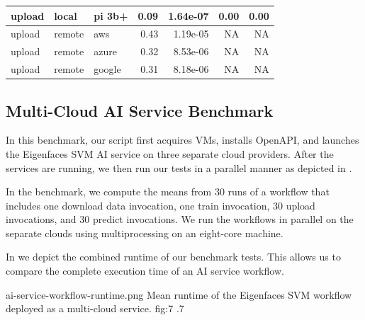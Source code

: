 \begin{table}[htb]
{\begin{tabular}{lllrrrr}
            upload &   local &    pi 3b+ &    0.09 & 1.64e-07 &                0.00 &             0.00 \\
\midrule
            upload &  remote &       aws &    0.43 & 1.19e-05 &                 NA &              NA \\
            upload &  remote &     azure &    0.32 & 8.53e-06 &                 NA &              NA \\
            upload &  remote &    google &    0.31 & 8.18e-06 &                 NA &              NA \\
\bottomrule
\end{tabular}
}
\end{table}

\subsection{Multi-Cloud AI Service Benchmark}
\label{sec-multi-benchmark}

In this benchmark, our script first acquires VMs, installs \Cloudmesh
OpenAPI, and launches the Eigenfaces SVM AI service on three separate
cloud providers.  After the
services are running, we then run our tests in a parallel manner as
depicted in . 

In the benchmark, we compute the means from 30 runs of a workflow that
includes one download data invocation, one train invocation, 30 upload
invocations, and 30 predict invocations. We run the workflows in
parallel on the separate clouds using multiprocessing on an eight-core
machine.

In  we depict the combined runtime of our benchmark
tests. This allows us to compare the complete execution time of an AI
service workflow.

\OneFIGURE
    {ai-service-workflow-runtime.png}
    {Mean runtime of the Eigenfaces SVM workflow deployed
     as a multi-cloud service.}
    {fig:7}
    {.7}
    
